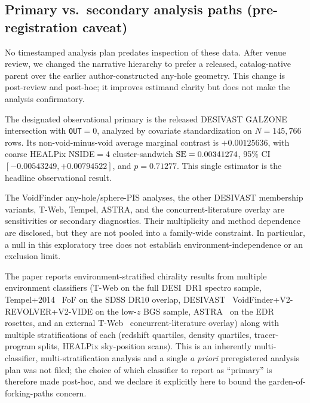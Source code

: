 \documentclass[aps,prd,twocolumn,superscriptaddress,showpacs,preprintnumbers,nofootinbib,longbibliography,floatfix]{revtex4-2}
\begin{document}
\subsection{Primary vs.\ secondary analysis paths (pre-registration
caveat)}\label{sec:primary_path}

No timestamped analysis plan predates inspection of these data. After
venue review, we changed the narrative hierarchy to prefer a released,
catalog-native parent over the earlier author-constructed any-hole
geometry. This change is post-review and post-hoc; it improves estimand
clarity but does not make the analysis confirmatory.

The designated observational primary is the released DESIVAST GALZONE
intersection with \texttt{OUT}$=0$, analyzed by covariate standardization
on $N=145{,}766$ rows. Its non-void-minus-void average marginal contrast
is $+0.00125636$, with coarse HEALPix NSIDE$=4$ cluster-sandwich
${\rm SE}=0.00341274$, 95\% CI $[-0.00543249,+0.00794522]$, and
$p=0.71277$. This single estimator is the headline observational result.

The VoidFinder any-hole/sphere-PIS analyses, the other DESIVAST
membership variants, T-Web, Tempel, ASTRA, and the concurrent-literature
overlay are sensitivities or secondary diagnostics. Their multiplicity
and method dependence are disclosed, but they are not pooled into a
family-wide constraint. In particular, a null in this exploratory tree
does not establish environment-independence or an exclusion limit.

\iffalse
The paper reports environment-stratified chirality results from
multiple environment classifiers (T-Web on the full DESI~DR1 spectro
sample, Tempel+2014~\cite{Tempel2014} FoF on the SDSS DR10 overlap,
DESIVAST~\cite{DESIVAST2025} VoidFinder+V2-REVOLVER+V2-VIDE on the
low-$z$ BGS sample, ASTRA~\cite{ASTRADESI2026} on the EDR rosettes,
and an external T-Web~\cite{TWebDESI2026} concurrent-literature
overlay) along with multiple stratifications of each
(redshift quartiles, density quartiles, tracer-program splits,
HEALPix sky-position scans). This is an inherently multi-classifier,
multi-stratification analysis and a single \emph{a priori} preregistered
analysis plan was not filed; the choice of which classifier to
report as ``primary'' is therefore made post-hoc, and we declare it
explicitly here to bound the garden-of-forking-paths concern.
\end{document}

